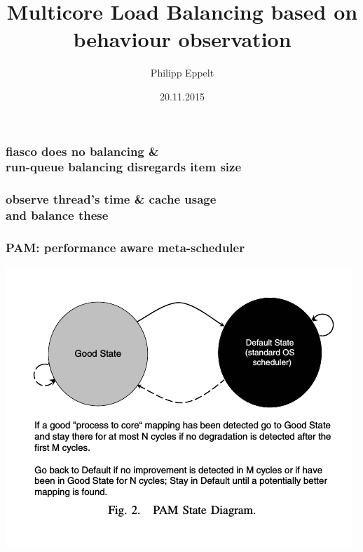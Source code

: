 \documentclass[utf8,10pt]{beamer}
\title[]{Multicore Load Balancing based on behaviour observation}
\author{Philipp Eppelt}
\date{20.11.2015}
\begin{document}
\maketitle

\large

\newcommand{\ft}[1]{\frametitle{\hfill #1}}


\begin{frame}
  \frametitle{fiasco does no balancing \& \\ run-queue balancing disregards
  item size}
  \centering
  \begin{minipage}[l]{.49\columnwidth}
    
  \end{minipage}
  \begin{minipage}[r]{.49\columnwidth}
    
  \end{minipage}
\end{frame}


\begin{frame}
  \frametitle{observe thread's time \& cache usage \\ and balance these}
  \centering
  \begin{minipage}[l]{.49\columnwidth}
    
  \end{minipage}
  \begin{minipage}[r]{.49\columnwidth}
    
  \end{minipage}
\end{frame}




\begin{frame}
  \frametitle{PAM: performance aware meta-scheduler}
  \centering
  \includegraphics[scale=.5]{./pam_state}
\end{frame}
\end{document}
